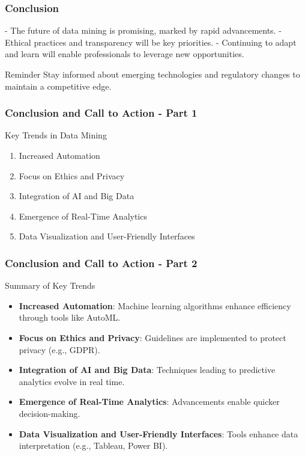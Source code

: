 \documentclass{beamer}
\begin{document}
\begin{frame}[fragile]
    \frametitle{Conclusion}
    - The future of data mining is promising, marked by rapid advancements.
    - Ethical practices and transparency will be key priorities.
    - Continuing to adapt and learn will enable professionals to leverage new opportunities.
    
    \begin{block}{Reminder}
        Stay informed about emerging technologies 
        and regulatory changes to maintain a competitive edge.
    \end{block}
\end{frame}

\begin{frame}[fragile]
    \frametitle{Conclusion and Call to Action - Part 1}
    \begin{block}{Key Trends in Data Mining}
        \begin{enumerate}
            \item Increased Automation
            \item Focus on Ethics and Privacy
            \item Integration of AI and Big Data
            \item Emergence of Real-Time Analytics
            \item Data Visualization and User-Friendly Interfaces
        \end{enumerate}
    \end{block}
\end{frame}

\begin{frame}[fragile]
    \frametitle{Conclusion and Call to Action - Part 2}
    \begin{block}{Summary of Key Trends}
        \begin{itemize}
            \item \textbf{Increased Automation}: Machine learning algorithms enhance efficiency through tools like AutoML.
            \item \textbf{Focus on Ethics and Privacy}: Guidelines are implemented to protect privacy (e.g., GDPR).
            \item \textbf{Integration of AI and Big Data}: Techniques leading to predictive analytics evolve in real time.
            \item \textbf{Emergence of Real-Time Analytics}: Advancements enable quicker decision-making.
            \item \textbf{Data Visualization and User-Friendly Interfaces}: Tools enhance data interpretation (e.g., Tableau, Power BI).
        \end{itemize}
    \end{block}
\end{frame}
\end{document}
